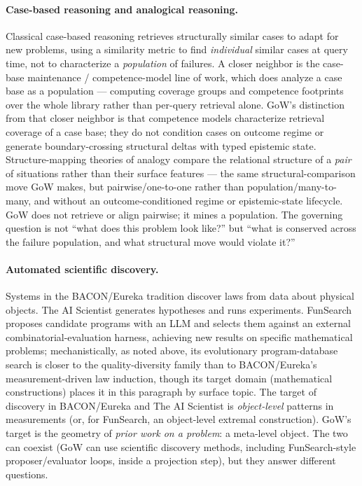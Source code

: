 \documentclass[11pt]{article}
\theoremstyle{gowthm}
\theoremstyle{gowplain}
\begin{document}
\paragraph{Case-based reasoning and analogical reasoning.}
Classical case-based reasoning \citep{kolodner1993case} retrieves structurally similar
cases to adapt for new problems, using a similarity metric to find
\emph{individual} similar cases at query time, not to characterize a \emph{population} of
failures. A closer neighbor is the case-base maintenance / competence-model
line of work, which does analyze a case base as a population --- computing
coverage groups and competence footprints over the whole library rather than
per-query retrieval alone. GoW's distinction from that closer neighbor is
that competence models characterize retrieval coverage of a case base; they
do not condition cases on outcome regime or generate boundary-crossing
structural deltas with typed epistemic state. Structure-mapping theories of
analogy \citep{gentner1983structure} compare the relational structure of a
\emph{pair} of situations rather than their surface features --- the same
structural-comparison move GoW makes, but pairwise/one-to-one rather than
population/many-to-many, and without an outcome-conditioned regime or
epistemic-state lifecycle. GoW does not retrieve or align pairwise; it mines
a population. The governing question is not
``what does this problem look like?'' but ``what is conserved across the
failure population, and what structural move would violate it?''

\paragraph{Automated scientific discovery.}
Systems in the BACON/Eureka tradition \citep{langley1987scientific} discover
laws from data about physical objects. The AI Scientist \citep{lu2024aiscientist}
generates hypotheses and runs experiments. FunSearch~\citep{romera2024funsearch}
proposes candidate programs with an LLM and selects them against an external
combinatorial-evaluation harness, achieving new results on specific
mathematical problems; mechanistically, as noted above, its evolutionary
program-database search is closer to the quality-diversity family than to
BACON/Eureka's measurement-driven law induction, though its target domain
(mathematical constructions) places it in this paragraph by surface topic.
The target of discovery in BACON/Eureka and The AI Scientist is
\emph{object-level} patterns in measurements (or, for FunSearch, an
object-level extremal construction). GoW's target is the geometry of
\emph{prior work on a problem}: a meta-level object. The two can coexist
(GoW can use scientific discovery methods, including FunSearch-style
proposer/evaluator loops, inside a projection step), but they answer
different questions.
\end{document}
